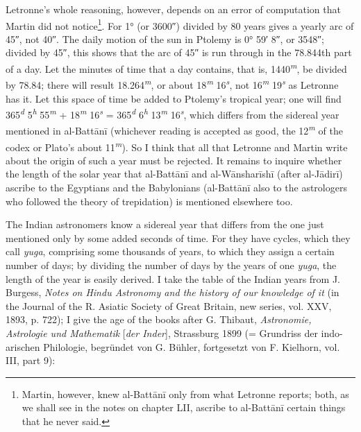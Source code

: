 \documentclass[11pt]{article}
\newcommand{\Pg}[1]{\marginpar{\footnotesize\color{gray}#1}}
\begin{document}
\par \Pg{I 206}Letronne's whole reasoning, however, depends on an error of computation that Martin did not notice\footnote{Martin, however, knew al-Battānī only from what Letronne reports; both, as we shall see in the notes on chapter LII, ascribe to al-Battānī certain things that he never said.}. For 1° (or 3600″) divided by 80 years gives a yearly arc of 45″, not 40″. The daily motion of the sun in Ptolemy is 0° 59′ 8″, or 3548″; divided by 45″, this shows that the arc of 45″ is run through in the 78.844th part of a day. Let the minutes of time that a day contains, that is, 1440\textsuperscript{\itshape m}, be divided by 78.84; there will result 18.264\textsuperscript{\itshape m}, or about 18\textsuperscript{\itshape m} 16\textsuperscript{\itshape s}, not 16\textsuperscript{\itshape m} 19\textsuperscript{\itshape s} as Letronne has it. Let this space of time be added to Ptolemy's tropical year; one will find 365\textsuperscript{\itshape d} 5\textsuperscript{\itshape h} 55\textsuperscript{\itshape m} + 18\textsuperscript{\itshape m} 16\textsuperscript{\itshape s} = 365\textsuperscript{\itshape d} 6\textsuperscript{\itshape h} 13\textsuperscript{\itshape m} 16\textsuperscript{\itshape s}, which differs from the sidereal year mentioned in al-Battānī (whichever reading is accepted as good, the 12\textsuperscript{\itshape m} of the codex or Plato's about 11\textsuperscript{\itshape m}). So I think that all that Letronne and Martin write about the origin of such a year must be rejected. It remains to inquire whether the length of the solar year that al-Battānī and al-Wānsharīshī (after al-Jādirī) ascribe to the Egyptians and the Babylonians (al-Battānī also to the astrologers who followed the theory of trepidation) is mentioned elsewhere too.\par
\par The Indian astronomers know a sidereal year that differs from the one just mentioned only by some added seconds of time. For they have cycles, which they call \emph{yuga}, comprising some thousands of years, to which they assign a certain number of days; by dividing the number of days by the years of one \emph{yuga}, the length of the year is easily derived. I take the table of the Indian years from J. Burgess, \emph{Notes on Hindu Astronomy and the history of our knowledge of it} (in the Journal of the R. Asiatic Society of Great Britain, new series, vol. XXV, 1893, p. 722); I give the age of the books after G. Thibaut, \emph{Astronomie, Astrologie und Mathematik} [\emph{der Inder}], Strassburg 1899 (= Grundriss der indo-arischen Philologie, begründet von G. Bühler, fortgesetzt von F. Kielhorn, vol. III, part 9):\par
\end{document}

